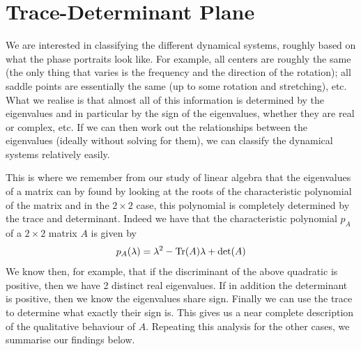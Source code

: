 
\section{Trace-Determinant Plane}
We are interested in classifying the different dynamical systems, roughly based on what the phase portraits look like. For example, all centers are roughly the same (the only thing that varies is the frequency and the direction of the rotation); all saddle points are essentially the same (up to some rotation and stretching), etc. What we realise is that almost all of this information is determined by the eigenvalues and in particular by the sign of the eigenvalues, whether they are real or complex, etc. If we can then work out the relationships between the eigenvalues (ideally without solving for them), we can classify the dynamical systems relatively easily.

This is where we remember from our study of linear algebra that the eigenvalues of a matrix can by found by looking at the roots of the characteristic polynomial of the matrix and in the $2 \times 2$ case, this polynomial is completely determined by the trace and determinant. Indeed we have that the characteristic polynomial $p_A$ of a $2 \times 2$ matrix $A$ is given by
$$ p_A(\lambda) = \lambda^2 - \mathrm{Tr}(A)\lambda + \det(A) $$
We know then, for example, that if the discriminant of the above quadratic is positive, then we have 2 distinct real eigenvalues. If in addition the determinant is positive, then we know the eigenvalues share sign. Finally we can use the trace to determine what exactly their sign is. This gives us a near complete description of the qualitative behaviour of $A$. Repeating this analysis for the other cases, we summarise our findings below.

